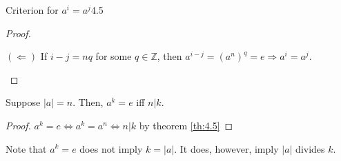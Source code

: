 \documentclass[12pt]{article}
\newcommand{\Z}{\mathbb{Z}}
\begin{document}
\begin{mythm}{Criterion for $a^i=a^j$}{4.5}
\begin{proof}
\begin{itemize}
\begin{enumerate}[label=(\roman*)]
					$(\Longleftarrow)$ If $i-j=nq$ for some $q\in\Z$, then $a^{i-j}=(a^n)^q=e\Longrightarrow a^i=a^j$.
				\end{enumerate}
			\end{itemize}
		\end{proof}
	\end{mythm}
	
	\begin{mycor}{}{}
		Suppose $|a|=n$. Then, $a^k=e$ iff $n|k$.
		\begin{proof}
			$a^k=e\Longleftrightarrow a^k=a^n\Longleftrightarrow n|k$ by theorem \ref{th:4.5}
		\end{proof}
	\end{mycor}
	
	\begin{myrem}{}{}
		Note that $a^k=e$ does not imply $k=|a|$. It does, however, imply $|a|$ divides $k$.
	\end{myrem}
	
\end{document}
